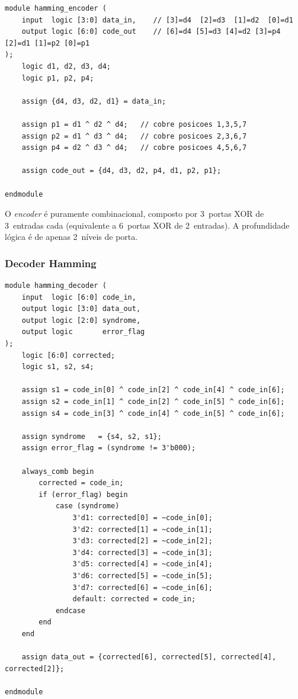 \documentclass[12pt,a4paper]{article}
\begin{document}
\begin{lstlisting}[style=svstyle,caption={hamming\_encoder.sv --- Codificador combinacional 4$\to$7 bits},label=lst:encoder]
module hamming_encoder (
    input  logic [3:0] data_in,    // [3]=d4  [2]=d3  [1]=d2  [0]=d1
    output logic [6:0] code_out    // [6]=d4 [5]=d3 [4]=d2 [3]=p4 [2]=d1 [1]=p2 [0]=p1
);
    logic d1, d2, d3, d4;
    logic p1, p2, p4;

    assign {d4, d3, d2, d1} = data_in;

    assign p1 = d1 ^ d2 ^ d4;   // cobre posicoes 1,3,5,7
    assign p2 = d1 ^ d3 ^ d4;   // cobre posicoes 2,3,6,7
    assign p4 = d2 ^ d3 ^ d4;   // cobre posicoes 4,5,6,7

    assign code_out = {d4, d3, d2, p4, d1, p2, p1};

endmodule
\end{lstlisting}

O \textit{encoder} é puramente combinacional, composto por 3~portas XOR de 3~entradas cada (equivalente a 6~portas XOR de 2~entradas). A profundidade lógica é de apenas 2~níveis de porta.

\subsubsection{Decoder Hamming}

\begin{lstlisting}[style=svstyle,caption={hamming\_decoder.sv --- Decodificador / Corretor combinacional 7$\to$4 bits},label=lst:decoder]
module hamming_decoder (
    input  logic [6:0] code_in,
    output logic [3:0] data_out,
    output logic [2:0] syndrome,
    output logic       error_flag
);
    logic [6:0] corrected;
    logic s1, s2, s4;

    assign s1 = code_in[0] ^ code_in[2] ^ code_in[4] ^ code_in[6];
    assign s2 = code_in[1] ^ code_in[2] ^ code_in[5] ^ code_in[6];
    assign s4 = code_in[3] ^ code_in[4] ^ code_in[5] ^ code_in[6];

    assign syndrome   = {s4, s2, s1};
    assign error_flag = (syndrome != 3'b000);

    always_comb begin
        corrected = code_in;
        if (error_flag) begin
            case (syndrome)
                3'd1: corrected[0] = ~code_in[0];
                3'd2: corrected[1] = ~code_in[1];
                3'd3: corrected[2] = ~code_in[2];
                3'd4: corrected[3] = ~code_in[3];
                3'd5: corrected[4] = ~code_in[4];
                3'd6: corrected[5] = ~code_in[5];
                3'd7: corrected[6] = ~code_in[6];
                default: corrected = code_in;
            endcase
        end
    end

    assign data_out = {corrected[6], corrected[5], corrected[4], corrected[2]};

endmodule
\end{lstlisting}
\end{document}
